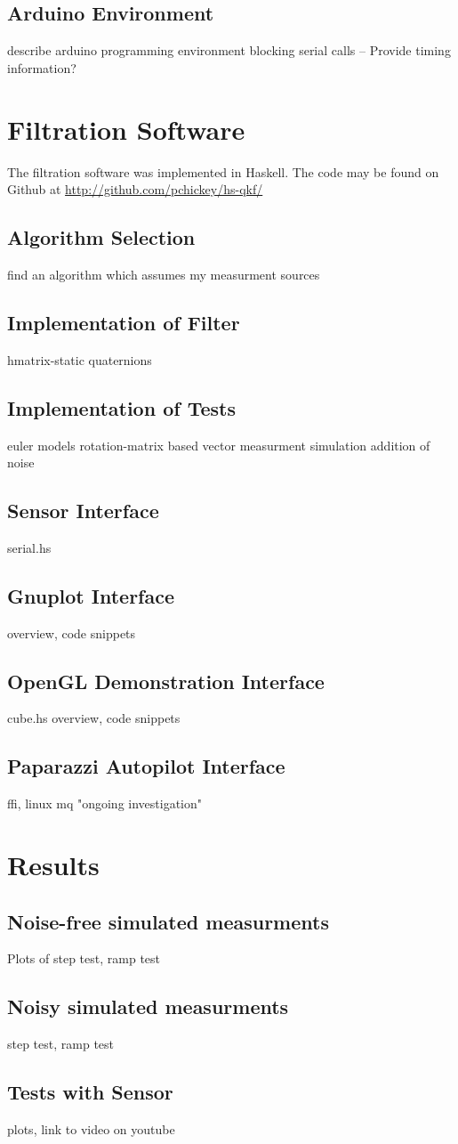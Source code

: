 \documentclass[12pt]{report}
\begin{document}
\subsection{Arduino Environment}
describe arduino programming environment
blocking serial calls
-- Provide timing information?

\section{Filtration Software}
The filtration software was implemented in Haskell. The code may be found on Github at \url{http://github.com/pchickey/hs-qkf/}
\subsection{Algorithm Selection}
find an algorithm which assumes my measurment sources
\subsection{Implementation of Filter}
hmatrix-static
quaternions
\subsection{Implementation of Tests}
euler models
rotation-matrix based vector measurment simulation
addition of noise
\subsection{Sensor Interface}
serial.hs
\subsection{Gnuplot Interface}
overview, code snippets
\subsection{OpenGL Demonstration Interface}
cube.hs overview, code snippets 
\subsection{Paparazzi Autopilot Interface}
ffi, linux mq
"ongoing investigation"

\section{Results}
\subsection{Noise-free simulated measurments}
Plots of step test, ramp test
\subsection{Noisy simulated measurments}
step test, ramp test
\subsection{Tests with Sensor}
plots, link to video on youtube
\end{document}
